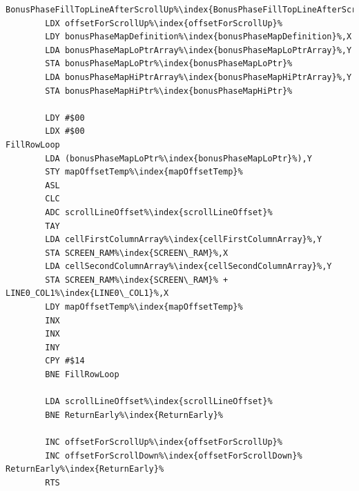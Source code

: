 \begin{minipage}[b]{0.45\linewidth}
\centering
\begin{lstlisting}[basicstyle=\tiny\ttfamily,escapechar=\%]
BonusPhaseFillTopLineAfterScrollUp%\index{BonusPhaseFillTopLineAfterScrollUp}%   
        LDX offsetForScrollUp%\index{offsetForScrollUp}%
        LDY bonusPhaseMapDefinition%\index{bonusPhaseMapDefinition}%,X
        LDA bonusPhaseMapLoPtrArray%\index{bonusPhaseMapLoPtrArray}%,Y
        STA bonusPhaseMapLoPtr%\index{bonusPhaseMapLoPtr}%
        LDA bonusPhaseMapHiPtrArray%\index{bonusPhaseMapHiPtrArray}%,Y
        STA bonusPhaseMapHiPtr%\index{bonusPhaseMapHiPtr}%

        LDY #$00
        LDX #$00
FillRowLoop
        LDA (bonusPhaseMapLoPtr%\index{bonusPhaseMapLoPtr}%),Y
        STY mapOffsetTemp%\index{mapOffsetTemp}%
        ASL 
        CLC 
        ADC scrollLineOffset%\index{scrollLineOffset}%
        TAY 
        LDA cellFirstColumnArray%\index{cellFirstColumnArray}%,Y
        STA SCREEN_RAM%\index{SCREEN\_RAM}%,X
        LDA cellSecondColumnArray%\index{cellSecondColumnArray}%,Y
        STA SCREEN_RAM%\index{SCREEN\_RAM}% + LINE0_COL1%\index{LINE0\_COL1}%,X
        LDY mapOffsetTemp%\index{mapOffsetTemp}%
        INX 
        INX 
        INY 
        CPY #$14
        BNE FillRowLoop

        LDA scrollLineOffset%\index{scrollLineOffset}%
        BNE ReturnEarly%\index{ReturnEarly}%

        INC offsetForScrollUp%\index{offsetForScrollUp}%
        INC offsetForScrollDown%\index{offsetForScrollDown}%
ReturnEarly%\index{ReturnEarly}%
        RTS 
\end{lstlisting}
\end{minipage}
\hspace{0.5cm}
